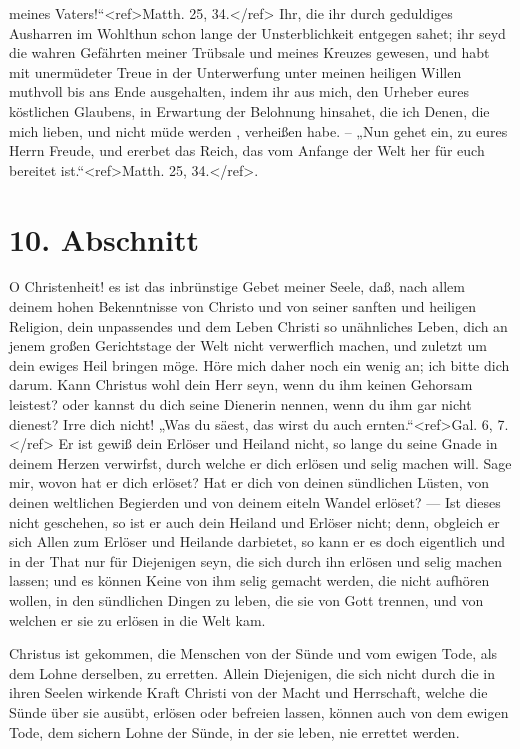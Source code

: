 meines Vaters!“<ref>Matth. 25, 34.</ref> Ihr, die ihr durch geduldiges Ausharren im Wohlthun schon lange der Unsterblichkeit entgegen sahet; ihr seyd die wahren Gefährten meiner Trübsale und meines Kreuzes gewesen, und habt mit unermüdeter Treue in der Unterwerfung unter meinen heiligen Willen muthvoll bis ans Ende ausgehalten, indem ihr aus mich, den Urheber eures köstlichen Glaubens, in Erwartung der Belohnung hinsahet, die ich Denen, die mich lieben, und nicht müde werden , verheißen habe. – „Nun gehet ein, zu eures Herrn Freude, und ererbet das Reich, das vom Anfange der Welt her für euch bereitet ist.“<ref>Matth. 25, 34.</ref>. 

\section{10. Abschnitt}

O Christenheit! es ist das inbrünstige Gebet meiner Seele, daß, nach allem deinem hohen Bekenntnisse von Christo und von seiner sanften und heiligen Religion, dein unpassendes und dem Leben Christi so unähnliches Leben, dich an jenem großen Gerichtstage der Welt nicht verwerflich machen, und zuletzt um dein ewiges Heil bringen möge. Höre mich daher noch ein wenig an; ich bitte dich darum. Kann Christus wohl dein Herr seyn, wenn du ihm keinen Gehorsam leistest? oder kannst du dich seine Dienerin nennen, wenn du ihm gar nicht dienest? Irre dich nicht! „Was du säest, das wirst du auch ernten.“<ref>Gal. 6, 7.</ref> Er ist gewiß dein Erlöser und Heiland nicht, so lange du seine Gnade in deinem Herzen verwirfst, durch welche er dich erlösen und selig machen will. Sage mir, wovon hat er dich erlöset? Hat er dich von deinen sündlichen Lüsten, von deinen weltlichen Begierden und von deinem eiteln Wandel erlöset? — Ist dieses nicht geschehen, so ist er auch dein Heiland und Erlöser nicht; denn, obgleich er sich Allen zum Erlöser und Heilande darbietet, so kann er es doch eigentlich und in der That nur für Diejenigen seyn, die sich durch ihn erlösen und selig machen lassen; und es können Keine von ihm selig gemacht werden, die nicht aufhören wollen, in den sündlichen Dingen zu leben, die sie von Gott trennen, und von welchen er sie zu erlösen in die Welt kam.

Christus ist gekommen, die Menschen von der Sünde und vom ewigen Tode, als dem Lohne derselben, zu erretten. Allein Diejenigen, die sich nicht durch die in ihren Seelen wirkende Kraft Christi von der Macht und Herrschaft, welche die Sünde über sie ausübt, erlösen oder befreien lassen, können auch von dem ewigen Tode, dem sichern Lohne der Sünde, in der sie leben, nie errettet werden.

